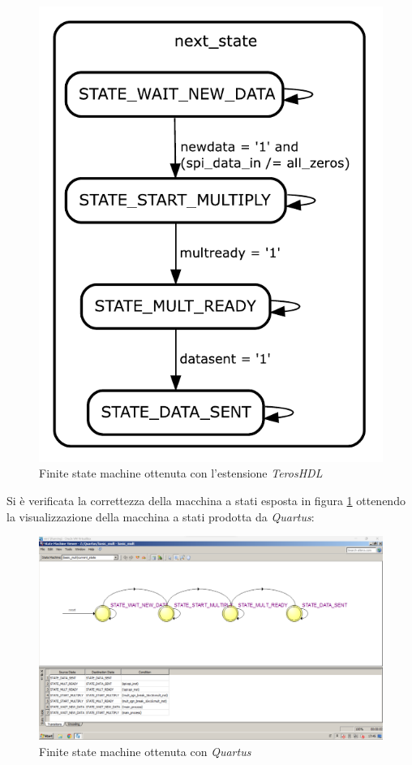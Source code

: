 \documentclass[titlepage]{report}
\begin{document}
			\begin{figure}[H]
				\centering
				\includegraphics[scale=0.6]{./img/basic_mult_state_machine_0.pdf}
				\caption{Finite state machine ottenuta con l'estensione \textit{TerosHDL}}
				\label{fig:fsm_teros}
			\end{figure}

			Si è verificata la correttezza della macchina a stati esposta in figura \ref*{fig:fsm_teros} ottenendo la visualizzazione della macchina a stati prodotta da \textit{Quartus}:

			\begin{figure}[H]
				\centering
				\includegraphics[scale=0.4]{./img/quartus_state_machine.png}
				\caption{Finite state machine ottenuta con \textit{Quartus}}
				\label{fig:fsm_quartus}
			\end{figure}	
\end{document}
